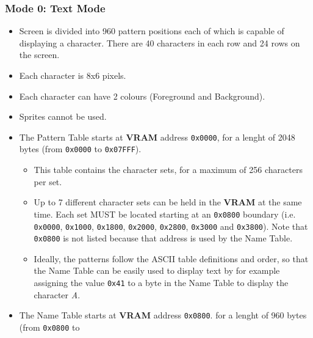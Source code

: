 \documentclass[a4paper,11pt]{article}
\begin{document}
    
        \subsubsection{Mode 0: \textbf{Text Mode}}
        \begin{itemize}
            \item Screen is divided into 960 pattern positions each of which is
                capable of displaying a character. There are 40 characters in
                each row and 24 rows on the screen.
            \item Each character is 8x6 pixels.
            \item Each character can have 2 colours (Foreground and Background).
            \item Sprites cannot be used.
            \item The Pattern Table starts at \textbf{VRAM} address
                \texttt{0x0000}, for a lenght of 2048 bytes (from
                \texttt{0x0000} to \texttt{0x07FFF}).
            \begin{itemize}
                \item This table contains the character sets, for a maximum of
                    256 characters per set.
                \item Up to 7 different character sets can be held in the
                    \textbf{VRAM} at the same time. Each set MUST be located
                    starting at an \texttt{0x0800} boundary (i.e. 
                    \texttt{0x0000}, \texttt{0x1000}, \texttt{0x1800},
                    \texttt{0x2000}, \texttt{0x2800}, \texttt{0x3000} and
                    \texttt{0x3800}). Note that \texttt{0x0800} is not listed
                    because that address is used by the Name Table.
                \item Ideally, the patterns follow the ASCII table definitions
                    and order, so that the Name Table can be easily used to
                    display text by for example assigning the value \texttt{0x41}
                    to a byte in the Name Table to display the character
                    \textit{A}.
            \end{itemize}
            \item The Name Table starts at \textbf{VRAM} address \texttt{0x0800}.
                for a lenght of 960 bytes (from \texttt{0x0800} to

\end{itemize}
\end{document}
